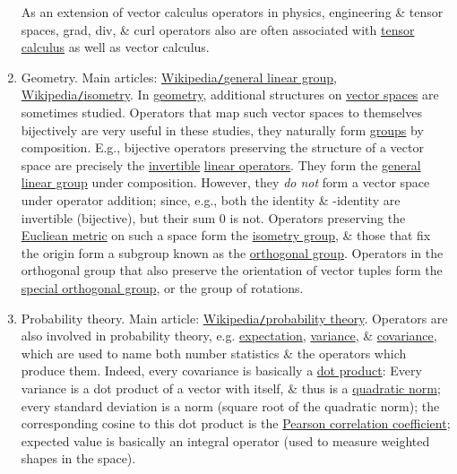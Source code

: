 \documentclass{article}
\begin{document}
\begin{enumerate}
	As an extension of vector calculus operators in physics, engineering \& tensor spaces, grad, div, \& curl operators also are often associated with \href{https://en.wikipedia.org/wiki/Tensor_calculus}{tensor calculus} as well as vector calculus.
	\item {\sf Geometry.} Main articles: \href{https://en.wikipedia.org/wiki/General_linear_group}{Wikipedia{\tt/}general linear group}, \href{https://en.wikipedia.org/wiki/Isometry}{Wikipedia{\tt/}isometry}. In \href{https://en.wikipedia.org/wiki/Geometry}{geometry}, additional structures on \href{https://en.wikipedia.org/wiki/Vector_space}{vector spaces} are sometimes studied. Operators that map such vector spaces to themselves bijectively are very useful in these studies, they naturally form \href{https://en.wikipedia.org/wiki/Group_(mathematics)}{groups} by composition. E.g., bijective operators preserving the structure of a vector space are precisely the \href{https://en.wikipedia.org/wiki/Invertible_function}{invertible} \href{https://en.wikipedia.org/wiki/Linear_operator}{linear operators}. They form the \href{https://en.wikipedia.org/wiki/General_linear_group}{general linear group} under composition. However, they {\it do not} form a vector space under operator addition; since, e.g., both the identity \& -identity are invertible (bijective), but their sum $0$ is not. Operators preserving the \href{https://en.wikipedia.org/wiki/Euclidean_metric}{Eucliean metric} on such a space form the \href{https://en.wikipedia.org/wiki/Isometry_group}{isometry group}, \& those that fix the origin form a subgroup known as the \href{https://en.wikipedia.org/wiki/Orthogonal_group}{orthogonal group}. Operators in the orthogonal group that also preserve the orientation of vector tuples form the \href{https://en.wikipedia.org/wiki/Special_orthogonal_group}{special orthogonal group}, or the group of rotations.
	\item {\sf Probability theory.} Main article: \href{https://en.wikipedia.org/wiki/Probability_theory}{Wikipedia{\tt/}probability theory}. Operators are also involved in probability theory, e.g. \href{https://en.wikipedia.org/wiki/Expected_value}{expectation}, \href{https://en.wikipedia.org/wiki/Variance}{variance}, \& \href{https://en.wikipedia.org/wiki/Covariance}{covariance}, which are used to name both number statistics \& the operators which produce them. Indeed, every covariance is basically a \href{https://en.wikipedia.org/wiki/Dot_product}{dot product}: Every variance is a dot product of a vector with itself, \& thus is a \href{https://en.wikipedia.org/wiki/Quadratic_norm}{quadratic norm}; every standard deviation is a norm (square root of the quadratic norm); the corresponding cosine to this dot product is the \href{https://en.wikipedia.org/wiki/Pearson_correlation_coefficient}{Pearson correlation coefficient}; expected value is basically an integral operator (used to measure weighted shapes in the space).

\end{enumerate}
\end{document}
